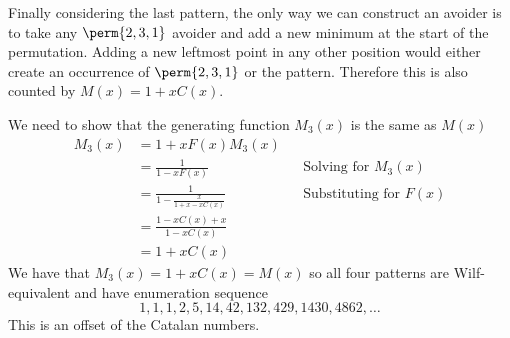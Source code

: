 Finally considering the last pattern, the only way we can construct an
avoider is to take any \(\perm{2,3,1}\) avoider and add a new minimum
at the start of the permutation. Adding a new leftmost point in any other
position would either create an occurrence of \(\perm{2,3,1}\) or the pattern.
Therefore this is also counted by \(M(x) = 1+xC(x)\).

We need to show that the generating function \(M_3(x)\) is the same as \(M(x)\)
\begin{equation*}
    \begin{aligned}
        M_3(x) &= 1 + xF(x)M_3(x) \\
        &= \frac{1}{1-xF(x)} && \text{Solving for \(M_3(x)\)}\\
        &= \frac{1}{1 - \frac{x}{1+x-xC(x)}} &&\text{Substituting for \(F(x)\)}\\
        &= \frac{1-xC(x) +x}{1-xC(x)}\\
        &= 1+xC(x)
    \end{aligned}
\end{equation*}
We have that \(M_3(x) = 1+xC(x)= M(x) \) so all four patterns are Wilf-equivalent
 and have enumeration sequence
 \begin{equation*}
     1, 1, 1, 2, 5, 14, 42, 132, 429, 1430, 4862,\dotsc
 \end{equation*}
 This is an offset of the Catalan numbers.

